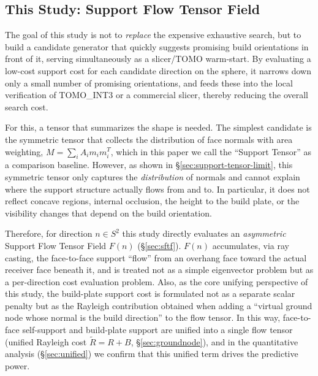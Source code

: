 \documentclass[11pt,a4paper]{article}
\begin{document}
\subsection{This Study: Support Flow Tensor Field}

The goal of this study is not to \emph{replace} the expensive exhaustive search, but to build a candidate generator
that quickly suggests promising build orientations in front of it, serving simultaneously as a slicer/TOMO warm-start.
By evaluating a low-cost support cost for each candidate direction on the sphere, it narrows down only a small number of promising orientations,
and feeds these into the local verification of TOMO\_INT3 or a commercial slicer, thereby reducing the overall search cost.

For this, a tensor that summarizes the shape is needed.
The simplest candidate is the symmetric tensor that collects the distribution of face normals with area weighting,
$M=\sum_i A_i m_i m_i^T$, which in this paper we call the ``Support Tensor'' as a comparison baseline.
However, as shown in \S\ref{sec:support-tensor-limit}, this symmetric tensor only captures the \emph{distribution} of normals
and cannot explain where the support structure actually flows from and to.
In particular, it does not reflect concave regions, internal occlusion, the height to the build plate,
or the visibility changes that depend on the build orientation.

Therefore, for direction $n\in S^2$ this study directly evaluates an \emph{asymmetric} Support Flow Tensor Field $F(n)$
(\S\ref{sec:sftf}).
$F(n)$ accumulates, via ray casting, the face-to-face support ``flow'' from an overhang face toward the actual receiver face beneath it,
and is treated not as a simple eigenvector problem but as a per-direction cost evaluation problem.
Also, as the core unifying perspective of this study, the build-plate support cost is formulated not as a separate scalar penalty but as
the Rayleigh contribution obtained when adding a ``virtual ground node whose normal is the build direction'' to the flow tensor.
In this way, face-to-face self-support and build-plate support are unified into a single flow tensor
(unified Rayleigh cost $\tilde R=R+B$, \S\ref{sec:groundnode}),
and in the quantitative analysis (\S\ref{sec:unified}) we confirm that this unified term drives the predictive power.
\end{document}
